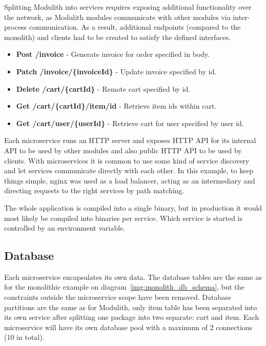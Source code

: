 Splitting Modulith into services requires exposing additional functionality over the network, as Modulith modules communicate with other modules via inter-process communication. As a result, additional endpoints (compared to the monolith) and clients had to be created to satisfy the defined interfaces.

\begin{itemize}
    \item \textbf{Post /invoice} - Generate invoice for order specified in body.
    \item \textbf{Patch /invoice/\{invoiceId\}} - Update invoice specified by id.
    \item \textbf{Delete /cart/\{cartId\}} - Remote cart specified by id.
    \item \textbf{Get /cart/\{cartId\}/item/id} - Retrieve item ids within cart.
    \item \textbf{Get /cart/user/\{userId\}} - Retrieve cart for user specified by user id.
\end{itemize}

Each microservice runs an HTTP server and exposes HTTP API for its internal API to be used by other modules and also public HTTP API to be used by clients. With microservices it is common to use some kind of service discovery and let services communicate directly with each other. In this example, to keep things simple, nginx was used as a load balancer, acting as an intermediary and directing requests to the right services by path matching.

The whole application is compiled into a single binary, but in production it would most likely be compiled into binaries per service. Which service is started is controlled by an environment variable.

%     

\subsection{Database}
Each microservice encapsulates its own data. The database tables are the same as for the monolithic example on diagram~\ref{img:monolith_db_schema}, but the constraints outside the microservice scope have been removed. Database partitions are the same as for Modulith, only item table has been separated into its own service after splitting one package into two separate: cart and item. Each microservice will have its own database pool with a maximum of 2 connections (10 in total).

